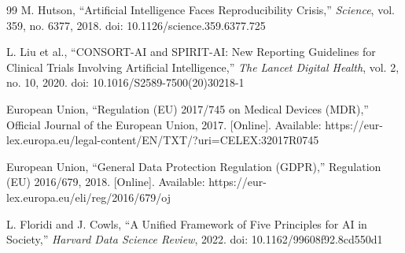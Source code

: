 \documentclass[lettersize,journal]{IEEEtran}
\begin{document}
\begin{thebibliography}{99}
M. Hutson,
``Artificial Intelligence Faces Reproducibility Crisis,''
\textit{Science}, vol. 359, no. 6377, 2018.
doi: 10.1126/science.359.6377.725

L. Liu et al.,
``CONSORT-AI and SPIRIT-AI: New Reporting Guidelines for Clinical Trials Involving Artificial Intelligence,''
\textit{The Lancet Digital Health}, vol. 2, no. 10, 2020.
doi: 10.1016/S2589-7500(20)30218-1

European Union,
``Regulation (EU) 2017/745 on Medical Devices (MDR),''
Official Journal of the European Union, 2017.
[Online]. Available: https://eur-lex.europa.eu/legal-content/EN/TXT/?uri=CELEX:32017R0745

European Union,
``General Data Protection Regulation (GDPR),'' Regulation (EU) 2016/679, 2018.
[Online]. Available: https://eur-lex.europa.eu/eli/reg/2016/679/oj

L. Floridi and J. Cowls,
``A Unified Framework of Five Principles for AI in Society,''
\textit{Harvard Data Science Review}, 2022.
doi: 10.1162/99608f92.8cd550d1

				
	\end{thebibliography}
	

	
\end{document}
